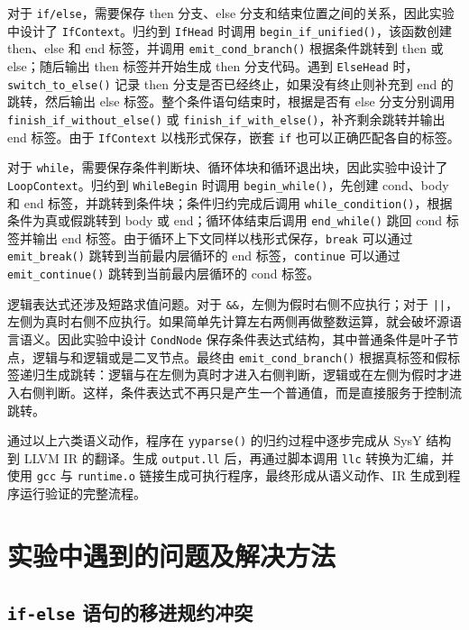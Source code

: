 \documentclass[12pt]{ctexart}
\begin{document}
对于 \texttt{if/else}，需要保存 then 分支、else 分支和结束位置之间的关系，因此实验中设计了 \texttt{IfContext}。归约到 \texttt{IfHead} 时调用 \texttt{begin\_if\_unified()}，该函数创建 then、else 和 end 标签，并调用 \texttt{emit\_cond\_branch()} 根据条件跳转到 then 或 else；随后输出 then 标签并开始生成 then 分支代码。遇到 \texttt{ElseHead} 时，\texttt{switch\_to\_else()} 记录 then 分支是否已经终止，如果没有终止则补充到 end 的跳转，然后输出 else 标签。整个条件语句结束时，根据是否有 else 分支分别调用 \texttt{finish\_if\_without\_else()} 或 \texttt{finish\_if\_with\_else()}，补齐剩余跳转并输出 end 标签。由于 \texttt{IfContext} 以栈形式保存，嵌套 \texttt{if} 也可以正确匹配各自的标签。

对于 \texttt{while}，需要保存条件判断块、循环体块和循环退出块，因此实验中设计了 \texttt{LoopContext}。归约到 \texttt{WhileBegin} 时调用 \texttt{begin\_while()}，先创建 cond、body 和 end 标签，并跳转到条件块；条件归约完成后调用 \texttt{while\_condition()}，根据条件为真或假跳转到 body 或 end；循环体结束后调用 \texttt{end\_while()} 跳回 cond 标签并输出 end 标签。由于循环上下文同样以栈形式保存，\texttt{break} 可以通过 \texttt{emit\_break()} 跳转到当前最内层循环的 end 标签，\texttt{continue} 可以通过 \texttt{emit\_continue()} 跳转到当前最内层循环的 cond 标签。

逻辑表达式还涉及短路求值问题。对于 \texttt{\&\&}，左侧为假时右侧不应执行；对于 \texttt{||}，左侧为真时右侧不应执行。如果简单先计算左右两侧再做整数运算，就会破坏源语言语义。因此实验中设计 \texttt{CondNode} 保存条件表达式结构，其中普通条件是叶子节点，逻辑与和逻辑或是二叉节点。最终由 \texttt{emit\_cond\_branch()} 根据真标签和假标签递归生成跳转：逻辑与在左侧为真时才进入右侧判断，逻辑或在左侧为假时才进入右侧判断。这样，条件表达式不再只是产生一个普通值，而是直接服务于控制流跳转。

通过以上六类语义动作，程序在 \texttt{yyparse()} 的归约过程中逐步完成从 SysY 结构到 LLVM IR 的翻译。生成 \texttt{output.ll} 后，再通过脚本调用 \texttt{llc} 转换为汇编，并使用 \texttt{gcc} 与 \texttt{runtime.o} 链接生成可执行程序，最终形成从语义动作、IR 生成到程序运行验证的完整流程。

\section{实验中遇到的问题及解决方法}

\subsection{\texttt{if-else} 语句的移进规约冲突}
\end{document}
